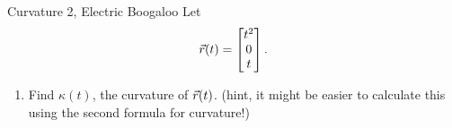 \begin{exercise}{Curvature 2, Electric Boogaloo}
Let $$\vec{r}(t)=\begin{bmatrix}t^2\\0\\t\end{bmatrix}.$$
\vspace{1em}
\begin{enumerate}
\item Find $\kappa(t)$, the curvature of $\vec{r}(t)$. (hint, it might be easier to calculate this using the second formula for curvature!)
\end{enumerate}
\end{exercise}